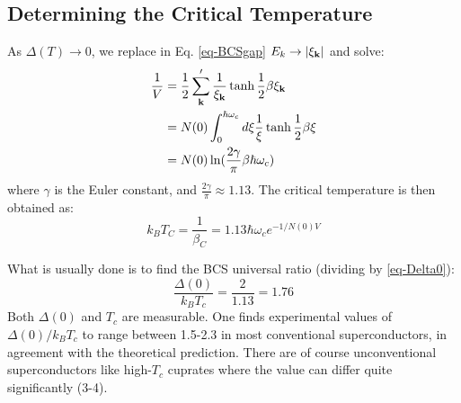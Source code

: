 \subsection{Determining the Critical Temperature}
As $\Delta(T) \to 0$, we replace in Eq. \eqref{eq-BCSgap} $E_k \to \lvert \xi_{\mathbf{k}} \rvert$ and solve:
\begin{equation}
    \begin{split}
        \frac{1}{V} &= \frac{1}{2}\sum_{\mathbf{k}}' \frac{1}{\xi_{\mathbf{k}}}\tanh \frac{1}{2}\beta \xi_{\mathbf{k}}
        \\ &= N(0)\int_0^{\hbar \omega_c}d\xi \frac{1}{\xi} \tanh \frac{1}{2}\beta \xi
        \\ &= N(0)\ln(\frac{2\gamma}{\pi} \beta \hbar \omega_c)
    \end{split}
\end{equation}
where $\gamma$ is the Euler constant, and $\frac{2\gamma}{\pi} \approx 1.13$. The critical temperature is then obtained as:
\begin{equation}
    k_B T_C = \frac{1}{\beta_C} = 1.13\hbar \omega_c e^{-1/N(0)V}
\end{equation}

What is usually done is to find the BCS universal ratio (dividing by \eqref{eq-Delta0}):
\begin{equation}
    \frac{\Delta(0)}{k_B T_c} = \frac{2}{1.13} = 1.76
\end{equation}
Both $\Delta(0)$ and $T_c$ are measurable. One finds experimental values of $\Delta(0)/k_B T_c$ to range between 1.5-2.3 in most conventional superconductors, in agreement with the theoretical prediction. There are of course unconventional superconductors like high-$T_c$ cuprates where the value can differ quite significantly (3-4). 

